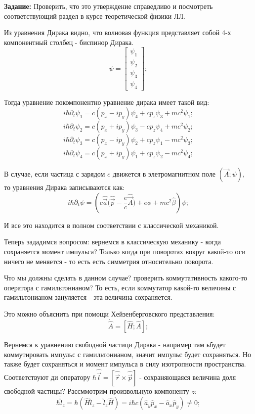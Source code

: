 \documentclass[a4paper, 14pt, russian]{article}
\newcommand{\be}{\begin{equation}}
\newcommand{\ee}{\end{equation}}
\newcommand{\pa}{\partial}
\begin{document}
	\begin{tcolorbox}
		\textbf{Задание:} Проверить, что это утверждение справедливо 
		и посмотреть соответствующий раздел в курсе теоретической физики ЛЛ.
	\end{tcolorbox}

	Из уравнения Дирака видно, что волновая функция представляет собой 4-х компонентный
	столбец - биспинор Дирака.
	\be
		\psi = \begin{bmatrix} \psi_1\\ \psi_2\\ \psi_3\\ \psi_4 \end{bmatrix};
	\ee

	Тогда уравнение покомпонентно уравнение дирака имеет такой вид:
	\be
			i \hbar \pa_t \psi_1 = c (p_x  - i p_y) \psi_4 + c p_z \psi_3 + mc^2 \psi_1;
	\ee
	\be
			i \hbar \pa_t \psi_2 = c (p_x  + i p_y) \psi_3 - c p_z \psi_4 + mc^2 \psi_2;
	\ee
	\be
			i \hbar \pa_t \psi_3 = c (p_x  - i p_y) \psi_2 + c p_z \psi_1 - mc^2 \psi_3;
	\ee
	\be
			i \hbar \pa_t \psi_4 = c (p_x  + i p_y) \psi_1 + c p_z \psi_2 - mc^2 \psi_4;
	\ee

	В случае, если частица с зарядом $e$ движется в элетромагнитном поле $(\vec A; \psi)$,
	то уравнения Дирака записываются как:
	\be
		i\hbar \pa_t \psi = \left(c \hat{\vec a} \big(\hat{\vec p} - \frac{e}{c} \hat{\vec A}\big)
		+ e \phi +mc^2 \hat{\beta}\right) \psi;
	\ee

	И все это находится в  полном соответствии с классической механикой.
	
	Теперь зададимся вопросом: вернемся в классическую механику - когда сохраняется момент импульса?
	Только когда при поворотах вокруг какой-то оси ничего не меняется - то есть есть симметрия 
	относительно поворота.

	Что мы должны сделать в данном случае? проверить коммутативность какого-то оператора с гамильтонианом?
	То есть, если коммутатор какой-то величины с гамильтонианом зануляется - эта величина сохраняется.

	Это можно объяснить при помощи Хейзенберговского представления:
	\be
			\dot{\hat A} = [\hat{H}; \hat{A}];
	\ee

	Вернемся к уравнению свободной частици Дирака - например там ьбудет коммутировать импульс с гамильтонианом,
	значит импульс будет сохраняться. Но также будет сохраняться и момент импульса в силу изотропности 
	пространства. Соответствуют ди оператору $\hbar \hat{\vec l} = [\hat{\vec r} \times \hat{\vec p}]$ -
	сохраняющаяся величина доля свободной частицы? Рассммотрим произвольную компоненту $z$:
	\be
		\hbar \dot{\hat{l}}_z = \hbar (\hat{H} \hat{l}_z - \hat{l}_z \hat{H}) = 
		i \hbar c (\hat{a}_y \hat{p}_x - \hat{a}_x \hat{p}_y) \neq 0;
	\ee
\end{document}
